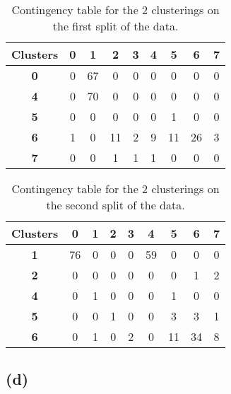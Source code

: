 \documentclass[12pt]{report} %
\begin{document}
\begin{table}[h]
\centering
\begin{tabular}{ |c|c|c|c|c|c|c|c|c| }
    \hline
    \textbf{Clusters} & \textbf{0} & \textbf{1} & \textbf{2} & \textbf{3} & \textbf{4} & \textbf{5} & \textbf{6} & \textbf{7} \\ 
    \hline
    \textbf{0} & 0 & 67 & 0 & 0 & 0 & 0 & 0 & 0 \\
    \hline
    \textbf{4} & 0 & 70 & 0 & 0 & 0 & 0 & 0 & 0 \\
    \hline
    \textbf{5} & 0 & 0 & 0 & 0 & 0 & 1 & 0 & 0 \\
    \hline
    \textbf{6} & 1 & 0 & 11 & 2 & 9 & 11 & 26 & 3 \\
    \hline
    \textbf{7} & 0 & 0 & 1 & 1 & 1 & 0 & 0 & 0 \\
    \hline

\end{tabular}
\caption{Contingency table for the 2 clusterings on the first split of the data.}
\end{table}


\begin{table}[h]
    \centering
    \begin{tabular}{ |c|c|c|c|c|c|c|c|c| }
        \hline
        \textbf{Clusters} & \textbf{0} & \textbf{1} & \textbf{2} & \textbf{3} & \textbf{4} & \textbf{5} & \textbf{6} & \textbf{7} \\ 
        \hline
        \textbf{1} & 76 & 0 & 0 & 0 & 59 & 0 & 0 & 0 \\
        \hline
        \textbf{2} & 0 & 0 & 0 & 0 & 0 & 0 & 1 & 2 \\
        \hline
        \textbf{4} & 0 & 1 & 0 & 0 & 0 & 1 & 0 & 0 \\
        \hline
        \textbf{5} & 0 & 0 & 1 & 0 & 0 & 3 & 3 & 1 \\
        \hline
        \textbf{6} & 0 & 1 & 0 & 2 & 0 & 11 & 34 & 8 \\
        \hline
    
    \end{tabular}
    \caption{Contingency table for the 2 clusterings on the second split of the data.}
\end{table}

\subsection*{(d)}
\end{document}
